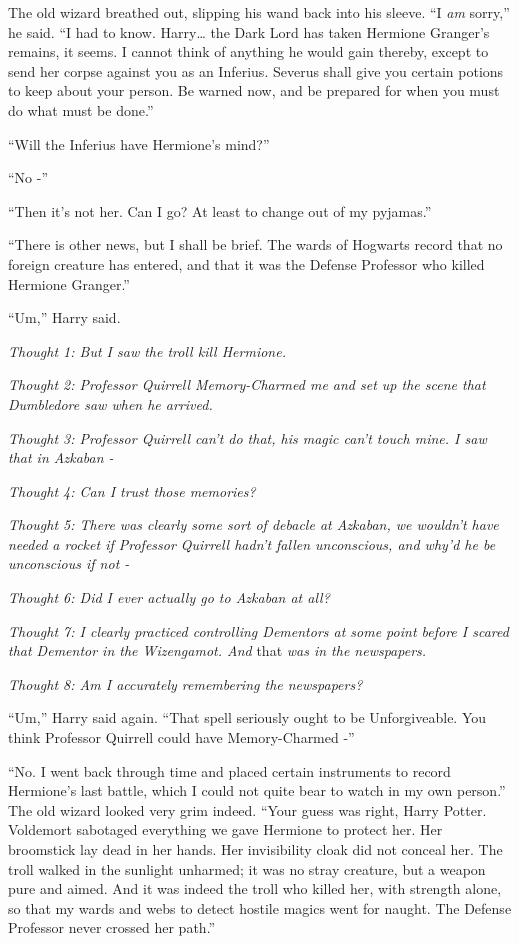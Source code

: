 The old wizard breathed out, slipping his wand back into his sleeve. ``I
\emph{am} sorry,'' he said. ``I had to know. Harry\ldots{} the Dark Lord
has taken Hermione Granger's remains, it seems. I cannot think of
anything he would gain thereby, except to send her corpse against you as
an Inferius. Severus shall give you certain potions to keep about your
person. Be warned now, and be prepared for when you must do what must be
done.''

``Will the Inferius have Hermione's mind?''

``No -''

``Then it's not her. Can I go? At least to change out of my pyjamas.''

``There is other news, but I shall be brief. The wards of Hogwarts
record that no foreign creature has entered, and that it was the Defense
Professor who killed Hermione Granger.''

``Um,'' Harry said.

\emph{Thought 1: But I saw the troll kill Hermione.}

\emph{Thought 2: Professor Quirrell Memory-Charmed me and set up the
scene that Dumbledore saw when he arrived.}

\emph{Thought 3: Professor Quirrell can't do that, his magic can't touch
mine. I saw that in Azkaban -}

\emph{Thought 4: Can I trust those memories?}

\emph{Thought 5: There was clearly some sort of debacle at Azkaban, we
wouldn't have needed a rocket if Professor Quirrell hadn't fallen
unconscious, and why'd he be unconscious if not -}

\emph{Thought 6: Did I ever actually go to Azkaban at all?}

\emph{Thought 7: I clearly practiced controlling Dementors at some point
before I scared that Dementor in the Wizengamot. And} that \emph{was in
the newspapers.}

\emph{Thought 8: Am I accurately remembering the newspapers?}

``Um,'' Harry said again. ``That spell seriously ought to be
Unforgiveable. You think Professor Quirrell could have Memory-Charmed
-''

``No. I went back through time and placed certain instruments to record
Hermione's last battle, which I could not quite bear to watch in my own
person.'' The old wizard looked very grim indeed. ``Your guess was
right, Harry Potter. Voldemort sabotaged everything we gave Hermione to
protect her. Her broomstick lay dead in her hands. Her invisibility
cloak did not conceal her. The troll walked in the sunlight unharmed; it
was no stray creature, but a weapon pure and aimed. And it was indeed
the troll who killed her, with strength alone, so that my wards and webs
to detect hostile magics went for naught. The Defense Professor never
crossed her path.''


